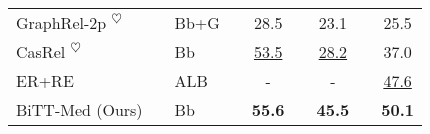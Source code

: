 \documentclass[conference]{IEEEtran}
\begin{document}
\begin{table}[t]
{\begin{tabular}{@{}llllclclc@{}}
        GraphRel-2p \cite{Fu2019Graphrel} \textsuperscript{$\heartsuit$}              &  & Bb+G     &  & 28.5             &  & 23.1             &  & 25.5             \\
        CasRel \cite{Wei2020CasRel} \textsuperscript{$\heartsuit$}              &  & Bb     &  & \underline{53.5}             &  & \underline{28.2}             &  & 37.0             \\
        ER+RE \cite{Zhang2022CBLUE}              &  & ALB     &  & -             &  & -             &  & \underline{47.6}             \\ \midrule
        BiTT-Med (Ours)                                                &  & Bb      &  & \textbf{55.6}             &  & \textbf{45.5}             &  & \textbf{50.1}             \\ \bottomrule
        \end{tabular}}
\end{table}
\end{document}
